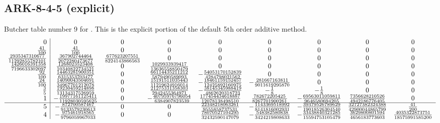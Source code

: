 \documentclass[letterpaper,10pt,english]{sphinxmanual}
\begin{document}
\subsection{ARK-8-4-5 (explicit)}
\label{Butcher:butcher-ark-8-4-5-e}\label{Butcher:ark-8-4-5-explicit}
Butcher table number 9
for {\hyperref[c_interface/User_callable:c.ARKodeSetERKTableNum]{\emph{}}}.  This is
the explicit portion of the default 5th order additive method.
\begin{gather}
\begin{split}\begin{array}{r|cccccccc}
  0 & 0 & 0 & 0 & 0 & 0 & 0 & 0 & 0 \\
  \frac{41}{100} & \frac{41}{100} & 0 & 0 & 0 & 0 & 0 & 0 & 0 \\
  \frac{2935347310677}{11292855782101} & \frac{367902744464}{2072280473677} & \frac{677623207551}{8224143866563} & 0 & 0 & 0 & 0 & 0 & 0 \\
  \frac{1426016391358}{7196633302097} & \frac{1268023523408}{10340822734521} & 0 & \frac{1029933939417}{13636558850479} & 0 & 0 & 0 & 0 & 0 \\
  \frac{92}{100} & \frac{14463281900351}{6315353703477} & 0 & \frac{66114435211212}{5879490589093} & -\frac{54053170152839}{4284798021562} & 0 & 0 & 0 & 0 \\
  \frac{24}{100} & \frac{14090043504691}{34967701212078} & 0 & \frac{15191511035443}{11219624916014} & -\frac{18461159152457}{12425892160975} & -\frac{281667163811}{9011619295870} & 0 & 0 & 0 \\
  \frac{3}{5} & \frac{19230459214898}{13134317526959} & 0 & \frac{21275331358303}{2942455364971} & -\frac{38145345988419}{4862620318723} & -\frac{1}{8} & -\frac{1}{8} & 0 & 0 \\
  1 & -\frac{19977161125411}{11928030595625} & 0 & -\frac{40795976796054}{6384907823539} & \frac{177454434618887}{12078138498510} & \frac{782672205425}{8267701900261} & -\frac{69563011059811}{9646580694205} & \frac{7356628210526}{4942186776405} & 0 \\
  \hline
  5 & -\frac{872700587467}{9133579230613} & 0 & 0 & \frac{22348218063261}{9555858737531} & -\frac{1143369518992}{8141816002931} & -\frac{39379526789629}{19018526304540} & \frac{32727382324388}{42900044865799} & \frac{41}{200} \\
  4 & -\frac{975461918565}{9796059967033} & 0 & 0 & \frac{78070527104295}{32432590147079} & -\frac{548382580838}{3424219808633} & -\frac{33438840321285}{15594753105479} & \frac{3629800801594}{4656183773603} & \frac{4035322873751}{18575991585200}
\end{array}\end{split}\notag
\end{gather}\begin{figure}[htbp]
\centering
\capstart


\end{figure}
\end{document}
